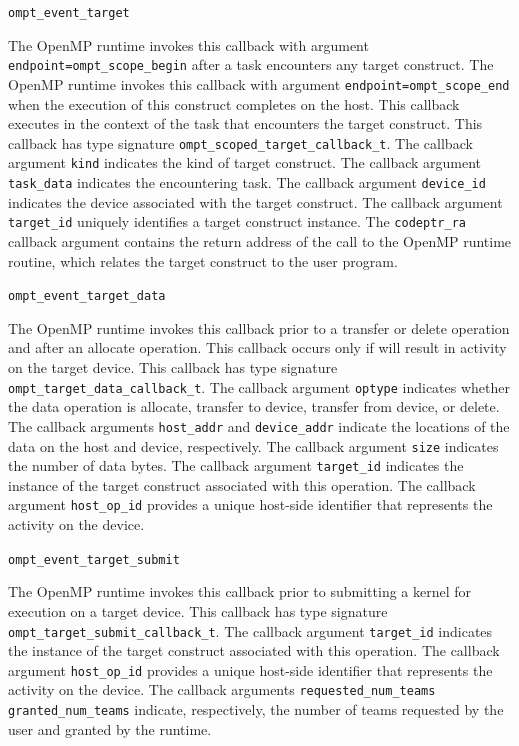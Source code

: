 \documentclass{article}
\begin{document}
\begin{description}

\item \verb|ompt_event_target|

The OpenMP runtime invokes this callback with argument \verb|endpoint=ompt_scope_begin| after a task encounters any target construct. 
The OpenMP runtime invokes this callback with argument \verb|endpoint=ompt_scope_end| when the execution of this construct completes on the host. 
This callback executes in the context of the task that encounters the target construct.
This callback has type signature \verb|ompt_scoped_target_callback_t|.
The callback argument \verb|kind| indicates the kind of target construct.
The callback argument \verb|task_data| indicates the encountering task.
The callback argument \verb|device_id| indicates the device associated with the target  construct.
The callback argument \verb|target_id| uniquely identifies a target construct instance.
The \verb|codeptr_ra| callback argument contains the return address of the call to the OpenMP runtime routine, which relates the target construct to the user program. 

\item \verb|ompt_event_target_data|

The OpenMP runtime invokes this callback prior to a transfer or delete operation and after an allocate operation. 
This callback occurs only if will result in activity on the target device.
This callback has type signature \verb|ompt_target_data_callback_t|.
The callback argument \verb|optype| indicates  whether the data operation is allocate, transfer to device, transfer from device, or delete.
The callback arguments \verb|host_addr| and \verb|device_addr|  indicate the locations of the data on the host and device, respectively.
The callback argument \verb|size| indicates the number of data bytes.
The callback argument \verb|target_id| indicates the instance of the target construct associated with this operation.
The callback argument \verb|host_op_id| provides a unique host-side identifier that represents the activity on the device.

\item \verb|ompt_event_target_submit|

The OpenMP runtime invokes this callback prior to submitting a kernel for execution on a target device. 
This callback has type signature \verb|ompt_target_submit_callback_t|.
The callback argument \verb|target_id| indicates the instance of the target construct associated with this operation.
The callback argument \verb|host_op_id| provides a unique host-side identifier that represents the activity on the device.
The callback arguments \verb|requested_num_teams|  \verb|granted_num_teams| indicate, respectively, the number of teams requested by the user and granted by the runtime.

\end{description}
\end{document}

